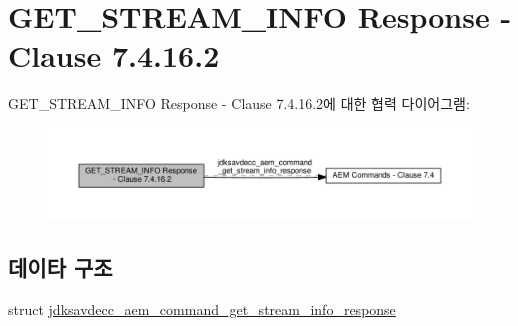 \hypertarget{group__command__get__stream__info__response}{}\section{G\+E\+T\+\_\+\+S\+T\+R\+E\+A\+M\+\_\+\+I\+N\+FO Response -\/ Clause 7.4.16.2}
\label{group__command__get__stream__info__response}
G\+E\+T\+\_\+\+S\+T\+R\+E\+A\+M\+\_\+\+I\+N\+FO Response -\/ Clause 7.4.16.2에 대한 협력 다이어그램\+:
\nopagebreak
\begin{figure}[H]
\begin{center}
\leavevmode
\includegraphics[width=350pt]{group__command__get__stream__info__response}
\end{center}
\end{figure}
\subsection*{데이타 구조}
\begin{DoxyCompactItemize}
\item 
struct \hyperlink{structjdksavdecc__aem__command__get__stream__info__response}{jdksavdecc\+\_\+aem\+\_\+command\+\_\+get\+\_\+stream\+\_\+info\+\_\+response}
\end{DoxyCompactItemize}
